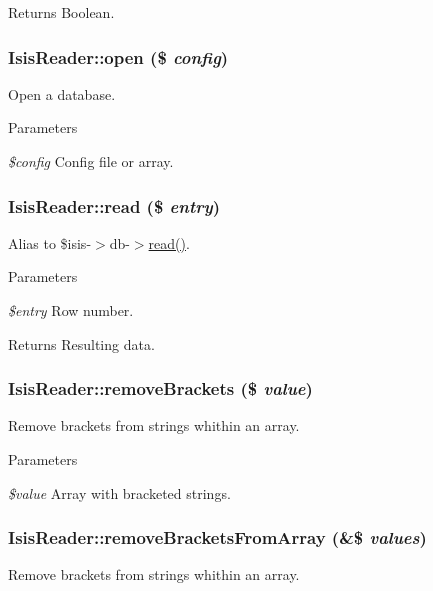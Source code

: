 \begin{DoxyReturn}{Returns}
Boolean. 
\end{DoxyReturn}
\hypertarget{classIsisReader_afa6e3d3d94854913e5ed2604919d2316}{
\subsubsection[{open}]{\setlength{\rightskip}{0pt plus 5cm}IsisReader::open (\$ {\em config})}}
\label{classIsisReader_afa6e3d3d94854913e5ed2604919d2316}
Open a database.


\begin{DoxyParams}{Parameters}
\item[{\em \$config}]Config file or array. \end{DoxyParams}
\hypertarget{classIsisReader_a630791a319bec2bc55d0102cbb7f93df}{
\subsubsection[{read}]{\setlength{\rightskip}{0pt plus 5cm}IsisReader::read (\$ {\em entry})}}
\label{classIsisReader_a630791a319bec2bc55d0102cbb7f93df}
Alias to \$isis-\/$>$db-\/$>$\hyperlink{classIsisReader_a630791a319bec2bc55d0102cbb7f93df}{read()}.


\begin{DoxyParams}{Parameters}
\item[{\em \$entry}]Row number.\end{DoxyParams}
\begin{DoxyReturn}{Returns}
Resulting data. 
\end{DoxyReturn}
\hypertarget{classIsisReader_a99ce7b10b2997dad6a64558ac1f9f10e}{
\subsubsection[{removeBrackets}]{\setlength{\rightskip}{0pt plus 5cm}IsisReader::removeBrackets (\$ {\em value})}}
\label{classIsisReader_a99ce7b10b2997dad6a64558ac1f9f10e}
Remove brackets from strings whithin an array.


\begin{DoxyParams}{Parameters}
\item[{\em \$value}]Array with bracketed strings. \end{DoxyParams}
\hypertarget{classIsisReader_a60ece3bbe11a2b4ac6afa6e65f282724}{
\subsubsection[{removeBracketsFromArray}]{\setlength{\rightskip}{0pt plus 5cm}IsisReader::removeBracketsFromArray (\&\$ {\em values})}}
\label{classIsisReader_a60ece3bbe11a2b4ac6afa6e65f282724}
Remove brackets from strings whithin an array.


